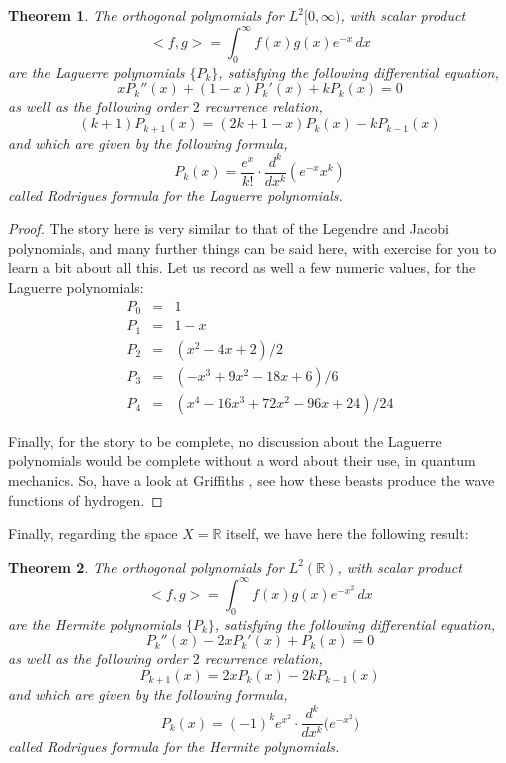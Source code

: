 \documentclass[12pt]{amsbook}
\newtheorem{theorem}{Theorem}[chapter]
\begin{document}

\begin{theorem}
The orthogonal polynomials for $L^2[0,\infty)$, with scalar product
$$<f,g>=\int_0^\infty f(x)g(x)e^{-x}\,dx$$
are the Laguerre polynomials $\{P_k\}$, satisfying the following differential equation,
$$xP_k''(x)+(1-x)P_k'(x)+kP_k(x)=0$$
as well as the following order $2$ recurrence relation,
$$(k+1)P_{k+1}(x)=(2k+1-x)P_k(x)-kP_{k-1}(x)$$
and which are given by the following formula,
$$P_k(x)=\frac{e^x}{k!}\cdot\frac{d^k}{dx^k}\left(e^{-x}x^k\right)$$
called Rodrigues formula for the Laguerre polynomials.
\end{theorem}

\begin{proof}
The story here is very similar to that of the Legendre and Jacobi polynomials, and many further things can be said here, with exercise for you to learn a bit about all this. Let us record as well a few numeric values, for the Laguerre polynomials:
\begin{eqnarray*}
P_0&=&1\\
P_1&=&1-x\\
P_2&=&(x^2-4x+2)/2\\
P_3&=&(-x^3+9x^2-18x+6)/6\\
P_4&=&(x^4-16x^3+72x^2-96x+24)/24
\end{eqnarray*}

Finally, for the story to be complete, no discussion about the Laguerre polynomials would be complete without a word about their use, in quantum mechanics. So, have a look at Griffiths \cite{gri}, see how these beasts produce the wave functions of hydrogen.
\end{proof}

Finally, regarding the space $X=\mathbb R$ itself, we have here the following result:


\begin{theorem}
The orthogonal polynomials for $L^2(\mathbb R)$, with scalar product
$$<f,g>=\int_0^\infty f(x)g(x)e^{-x^2}\,dx$$
are the Hermite polynomials $\{P_k\}$, satisfying the following differential equation,
$$P_k''(x)-2xP_k'(x)+P_k(x)=0$$
as well as the following order $2$ recurrence relation,
$$P_{k+1}(x)=2xP_k(x)-2kP_{k-1}(x)$$
and which are given by the following formula,
$$P_k(x)=(-1)^k e^{x^2}\cdot\frac{d^k}{dx^k}\big(e^{-x^2}\big)$$
called Rodrigues formula for the Hermite polynomials.
\end{theorem}
\end{document}
